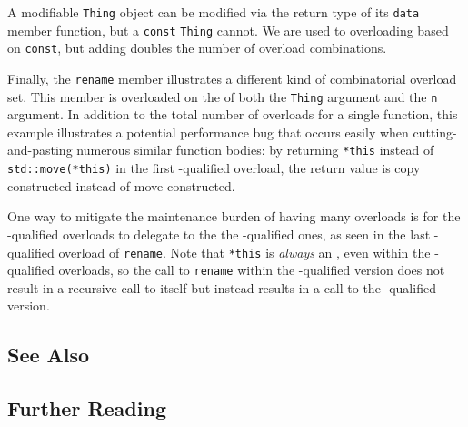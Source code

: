 A modifiable \lstinline!Thing! object can be modified via the return type
of its \lstinline!data! member function, but a \lstinline!const!
\lstinline!Thing! cannot. We are used to overloading based on
\lstinline!const!, but adding  doubles the number
of overload combinations.

Finally, the \lstinline!rename! member illustrates a different kind of
combinatorial overload set. This member is overloaded on the
 of both the \lstinline!Thing! argument and the
\lstinline!n! argument. In addition to the total number of overloads for a
single function, this example illustrates a potential performance bug
that occurs easily when cutting-and-pasting numerous similar function
bodies: by returning \lstinline!*this! instead of \lstinline!std::move(*this)!
in the first -qualified overload, the return value is copy
constructed instead of move constructed.

One way to mitigate the maintenance burden of having many overloads is
for the -qualified overloads to delegate to the the
-qualified ones, as seen in the last
-qualified overload of \lstinline!rename!. Note that
\lstinline!*this! is \emph{always} an , even within the
-qualified overloads, so the call to \lstinline!rename! within
the -qualified version does not result in a recursive call
to itself but instead results in a call to the -qualified
version.

\subsection{See Also}

\hspace{\fill}

\subsection{Further Reading}

\hspace{\fill}
